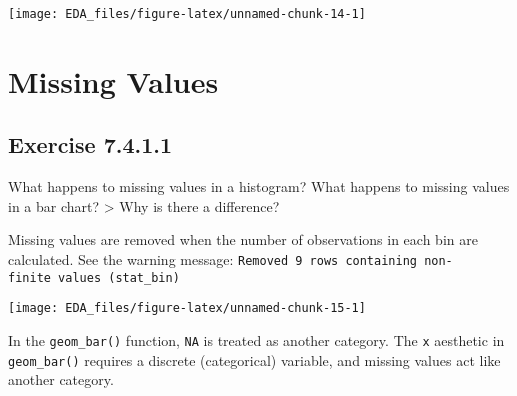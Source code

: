\documentclass[]{book}
\newenvironment{Shaded}{\begin{snugshade}}{\end{snugshade}}
\newcommand{\CommentTok}[1]{\textcolor[rgb]{0.56,0.35,0.01}{\textit{#1}}}
\newcommand{\DataTypeTok}[1]{\textcolor[rgb]{0.13,0.29,0.53}{#1}}
\newcommand{\DecValTok}[1]{\textcolor[rgb]{0.00,0.00,0.81}{#1}}
\newcommand{\KeywordTok}[1]{\textcolor[rgb]{0.13,0.29,0.53}{\textbf{#1}}}
\newcommand{\NormalTok}[1]{#1}
\newcommand{\OperatorTok}[1]{\textcolor[rgb]{0.81,0.36,0.00}{\textbf{#1}}}
\newcommand{\OtherTok}[1]{\textcolor[rgb]{0.56,0.35,0.01}{#1}}
\newcommand{\StringTok}[1]{\textcolor[rgb]{0.31,0.60,0.02}{#1}}
\theoremstyle{plain}
\theoremstyle{remark}
\begin{document}
\begin{center}\texttt{[image: EDA\_files/figure-latex/unnamed-chunk-14-1]} \end{center}

\hypertarget{missing-values}{%
\section{Missing Values}\label{missing-values}}

\hypertarget{exercise-7.4.1.1}{%
\subsection*{\texorpdfstring{Exercise
{7.4.1.1}}{Exercise 7.4.1.1}}\label{exercise-7.4.1.1}}

What happens to missing values in a histogram? What happens to missing
values in a bar chart? \textgreater{} Why is there a difference?

Missing values are removed when the number of observations in each bin
are calculated. See the warning message:
\texttt{Removed\ 9\ rows\ containing\ non-finite\ values\ (stat\_bin)}

\begin{Shaded}
\end{Shaded}

\begin{center}\texttt{[image: EDA\_files/figure-latex/unnamed-chunk-15-1]} \end{center}

In the \texttt{geom\_bar()} function, \texttt{NA} is treated as another
category. The \texttt{x} aesthetic in \texttt{geom\_bar()} requires a
discrete (categorical) variable, and missing values act like another
category.
\end{document}
